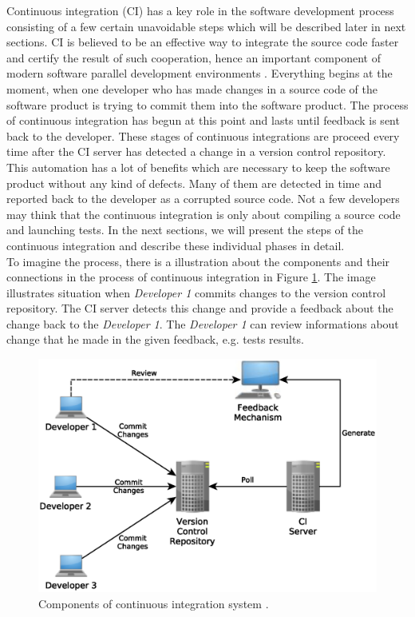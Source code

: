 Continuous integration (CI) has a key role in the software development process consisting of a few certain unavoidable steps which will be described later in next sections. CI is believed to be an effective way to integrate the source code faster and certify the result of such cooperation, hence an important component of modern software parallel development environments \cite{ResultsOfCIbuild}. Everything begins at the moment, when one developer who has made changes in a source code of the software product is trying to commit them into the software product. The process of continuous integration has begun at this point and lasts until feedback is sent back to the developer. These stages of continuous integrations are proceed every time after the CI server has detected a change in a version control repository. This automation has a lot of benefits which are necessary to keep the software product without any kind of defects. Many of them are detected in time and reported back to the developer as a corrupted source code. Not a few developers may think that the continuous integration is only about compiling a source code and launching tests. In the next sections, we will present the steps of the continuous integration and describe these individual phases in detail.\\

To imagine the process, there is a illustration about the components and their connections in the process of continuous integration in Figure \ref{fig:cocis}. The image illustrates situation when \textit{Developer 1} commits changes to the version control repository. The CI server detects this change and provide a feedback about the change back to the \textit{Developer 1}. The \textit{Developer 1} can review informations about change that he made in the given feedback, e.g. tests results.

\begin{figure}[H]
    \centering
    \includegraphics[scale=0.6]{yEd/components_of_CI_system.eps}
    \caption{Components of continuous integration system \cite{CIbook}.}
    \label{fig:cocis}
\end{figure}

